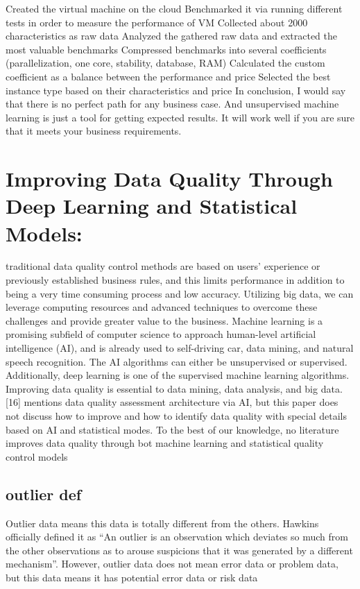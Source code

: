 \documentclass{article}
\begin{document}
Created the virtual machine on the cloud
Benchmarked it via running different tests in order to measure the performance of VM
Collected about 2000 characteristics as raw data
Analyzed the gathered raw data and extracted the most valuable benchmarks
Compressed benchmarks into several coefficients (parallelization, one core, stability, database, RAM)
Calculated the custom coefficient as a balance between the performance and price
Selected the best instance type based on their characteristics and price
In conclusion, I would say that there is no perfect path for any business case. And unsupervised machine learning is just a tool for getting expected results. It will work well if you are sure that it meets your business requirements.
\section{Improving Data Quality Through Deep Learning and Statistical Models:}
traditional data quality control
methods are based on users’ experience or
previously established business rules, and this
limits performance in addition to being a very
time consuming process and low accuracy.
Utilizing big data, we can leverage computing
resources and advanced techniques to overcome
these challenges and provide greater value to the
business.
Machine learning is a promising subfield of
computer science to approach human-level
artificial intelligence (AI), and is already used to
self-driving car, data mining, and natural speech
recognition.
The AI algorithms can either
be unsupervised or supervised. Additionally,
deep learning is one of the supervised machine
learning algorithms.
Improving data quality
is essential to data mining, data analysis, and big
data. [16] mentions data quality assessment
architecture via AI, but this paper does not
discuss how to improve and how to identify data
quality with special details based on AI and
statistical modes.
To the best of our knowledge,
no literature improves data quality through bot
machine learning and statistical quality control
models
\subsection{outlier def}
Outlier data means this data is totally
different from the others. Hawkins officially
defined it as “An outlier is an observation which
deviates so much from the other observations as
to arouse suspicions that it was generated by a
different mechanism”.
However, outlier data
does not mean error data or problem data, but
this data means it has potential error data or risk
data
\end{document}
